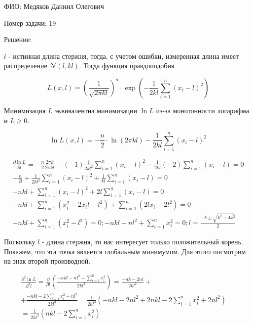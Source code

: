 \documentclass[14pt]{extarticle}
\begin{document}
ФИО: Медяков Даниил Олегович

\vspace{10pt}

Номер задачи: 19

\vspace{10pt}

Решение:

\vspace{10pt}

$l$ - истинная длина стержня, тогда, с учетом ошибки, измеренная длина имеет распределение $\mathcal{N}(l, kl)$. Тогда функция правдоподобия

\begin{equation*}
    L(x, l) = \left(\frac{1}{\sqrt{2\pi kl}}\right)^n\cdot \exp \left(-\frac{1}{2kl}\sum\limits_{i=1}^n (x_i - l)^2\right)
\end{equation*}

Минимизация $L$ эквивалентна минимизации $\ln L$ из-за монотонности логарифма и $L \geqslant 0$. 

\begin{equation*}
    \ln L(x, l) = -\frac{n}{2}\cdot\ln(2\pi kl)-\frac{1}{2kl}\sum\limits_{i=1}^n (x_i - l)^2
\end{equation*}

\begin{gather*}
    \frac{\partial \ln L}{\partial l} = -\frac{n}{2}\frac{2\pi k}{2\pi kl} - (-1)\frac{1}{2kl^2}\sum\limits_{i=1}^n (x_i - l)^2 - \frac{1}{2kl}(-2)\sum\limits_{i=1}^n (x_i - l) = 0\\
    -\frac{n}{2l}+\frac{1}{2kl^2}\sum\limits_{i=1}^n (x_i - l)^2 + \frac{1}{kl}\sum\limits_{i=1}^n (x_i - l) = 0\\
    -nkl + \sum\limits_{i=1}^n (x_i - l)^2 + 2l\sum\limits_{i=1}^n (x_i - l) = 0\\
    -nkl + \sum\limits_{i=1}^n (x_i^2 - 2x_i l - l^2) + \sum\limits_{i=1}^n (2lx_i - 2l^2) = 0\\
    -nkl + \sum\limits_{i=1}^n (x_i^2 - l^2) = 0; -nkl - nl^2 + \sum\limits_{i=1}^n x_i^2 = 0; l = \frac{-k \pm \sqrt{k^2 + 4\overline{x^2}}}{2}
\end{gather*}

Поскольку $l$ - длина стержня, то нас интересует только положительный корень. Покажем, что эта точка является глобальным минимумом. Для этого посмотрим на знак второй производной.

\begin{gather*}
    \frac{\partial^2 \ln L}{\partial^2 l} = \frac{\partial}{\partial l}\left(\frac{-nkl - nl^2 + \sum\limits_{i=1}^n x_i^2}{2kl^2}\right) = \frac{-nk - 2nl}{2kl^2} +\\
    + \frac{-nkl - 2 \sum\limits_{i=1}^n x_i^2 - nl^2}{2kl^3} = \frac{1}{2kl^3}\left(-nkl - 2nl^2 + 2nkl - 2\sum\limits_{i=1}^n x_i^2 + 2nl^2\right) =\\
    =\frac{1}{2kl^3}\left(nkl - 2\sum\limits_{i=1}^n x_i^2\right)
\end{gather*}
\end{document}
